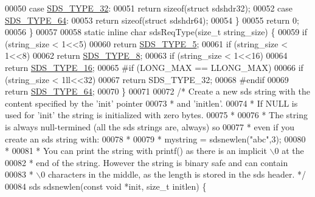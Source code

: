 \begin{DoxyCode}
00050         \textcolor{keywordflow}{case} \hyperlink{sds_8h_a0ad2103bbdaa2fe5511ce3279cb42293}{SDS\_TYPE\_32}:
00051             \textcolor{keywordflow}{return} \textcolor{keyword}{sizeof}(\textcolor{keyword}{struct} sdshdr32);
00052         \textcolor{keywordflow}{case} \hyperlink{sds_8h_ad03c6e0fdab3a871e10cce347e8bb4e6}{SDS\_TYPE\_64}:
00053             \textcolor{keywordflow}{return} \textcolor{keyword}{sizeof}(\textcolor{keyword}{struct} sdshdr64);
00054     \}
00055     \textcolor{keywordflow}{return} 0;
00056 \}
00057 
00058 \textcolor{keyword}{static} \textcolor{keyword}{inline} \textcolor{keywordtype}{char} sdsReqType(size\_t string\_size) \{
00059     \textcolor{keywordflow}{if} (string\_size < 1<<5)
00060         \textcolor{keywordflow}{return} \hyperlink{sds_8h_a3b7b67f1efa75f6b78ae18ea853b1a91}{SDS\_TYPE\_5};
00061     \textcolor{keywordflow}{if} (string\_size < 1<<8)
00062         \textcolor{keywordflow}{return} \hyperlink{sds_8h_a504136356f04bfa2fd616dd4c8fdd71c}{SDS\_TYPE\_8};
00063     \textcolor{keywordflow}{if} (string\_size < 1<<16)
00064         \textcolor{keywordflow}{return} \hyperlink{sds_8h_aa54044bf70a30824caeb1bab3615bff2}{SDS\_TYPE\_16};
00065 \textcolor{preprocessor}{#}\textcolor{preprocessor}{if} \textcolor{preprocessor}{(}\textcolor{preprocessor}{LONG\_MAX} \textcolor{preprocessor}{==} LLONG\_MAX\textcolor{preprocessor}{)}
00066     \textcolor{keywordflow}{if} (string\_size < 1ll<<32)
00067         \textcolor{keywordflow}{return} SDS\_TYPE\_32;
00068 \textcolor{preprocessor}{#}\textcolor{preprocessor}{endif}
00069     \textcolor{keywordflow}{return} \hyperlink{sds_8h_ad03c6e0fdab3a871e10cce347e8bb4e6}{SDS\_TYPE\_64};
00070 \}
00071 
00072 \textcolor{comment}{/* Create a new sds string with the content specified by the 'init' pointer}
00073 \textcolor{comment}{ * and 'initlen'.}
00074 \textcolor{comment}{ * If NULL is used for 'init' the string is initialized with zero bytes.}
00075 \textcolor{comment}{ *}
00076 \textcolor{comment}{ * The string is always null-termined (all the sds strings are, always) so}
00077 \textcolor{comment}{ * even if you create an sds string with:}
00078 \textcolor{comment}{ *}
00079 \textcolor{comment}{ * mystring = sdsnewlen("abc",3);}
00080 \textcolor{comment}{ *}
00081 \textcolor{comment}{ * You can print the string with printf() as there is an implicit \(\backslash\)0 at the}
00082 \textcolor{comment}{ * end of the string. However the string is binary safe and can contain}
00083 \textcolor{comment}{ * \(\backslash\)0 characters in the middle, as the length is stored in the sds header. */}
00084 sds sdsnewlen(\textcolor{keyword}{const} \textcolor{keywordtype}{void} *init, size\_t initlen) \{

\end{DoxyCode}
